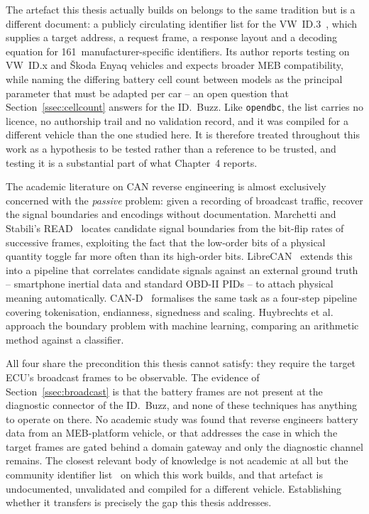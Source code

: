 \documentclass[11pt,a4paper,oneside,parskip=half]{scrreprt}
\begin{document}
The artefact this thesis actually builds on belongs to the same tradition but is a different document: a publicly circulating identifier list for the VW~ID.3~\cite{vwmebpidlist}, which supplies a target address, a request frame, a response layout and a decoding equation for 161~manufacturer-specific identifiers. Its author reports testing on VW~ID.x and \v{S}koda Enyaq vehicles and expects broader MEB compatibility, while naming the differing battery cell count between models as the principal parameter that must be adapted per car -- an open question that Section~\ref{ssec:cellcount} answers for the ID.~Buzz. Like \texttt{opendbc}, the list carries no licence, no authorship trail and no validation record, and it was compiled for a different vehicle than the one studied here. It is therefore treated throughout this work as a hypothesis to be tested rather than a reference to be trusted, and testing it is a substantial part of what Chapter~4 reports.

The academic literature on CAN reverse engineering is almost exclusively concerned with the \emph{passive} problem: given a recording of broadcast traffic, recover the signal boundaries and encodings without documentation. Marchetti and Stabili's READ~\cite{read} locates candidate signal boundaries from the bit-flip rates of successive frames, exploiting the fact that the low-order bits of a physical quantity toggle far more often than its high-order bits. LibreCAN~\cite{librecan} extends this into a pipeline that correlates candidate signals against an external ground truth -- smartphone inertial data and standard OBD-II PIDs -- to attach physical meaning automatically. CAN-D~\cite{cand} formalises the same task as a four-step pipeline covering tokenisation, endianness, signedness and scaling. Huybrechts et al.~\cite{huybrechts2018automatic} approach the boundary problem with machine learning, comparing an arithmetic method against a classifier.

All four share the precondition this thesis cannot satisfy: they require the target ECU's broadcast frames to be observable. The evidence of Section~\ref{ssec:broadcast} is that the battery frames are not present at the diagnostic connector of the ID.~Buzz, and none of these techniques has anything to operate on there. No academic study was found that reverse engineers battery data from an MEB-platform vehicle, or that addresses the case in which the target frames are gated behind a domain gateway and only the diagnostic channel remains. The closest relevant body of knowledge is not academic at all but the community identifier list~\cite{vwmebpidlist} on which this work builds, and that artefact is undocumented, unvalidated and compiled for a different vehicle. Establishing whether it transfers is precisely the gap this thesis addresses.
\end{document}
